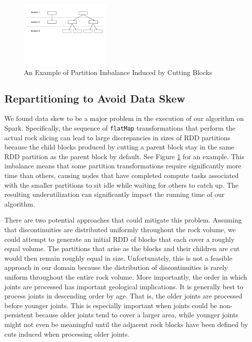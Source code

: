 \begin{figure}[h]
\centering
\includegraphics[width=0.4\textwidth]{flatMap.pdf}
\caption{An Example of Partition Imbalance Induced by Cutting Blocks}
\label{fig:flatMap}
\end{figure}

\subsection{Repartitioning to Avoid Data Skew}
We found data skew to be a major problem in the execution of our algorithm on Spark. Specifically, the sequence of \texttt{flatMap} transformations that perform the actual rock slicing can lead to large discrepancies in sizes of RDD partitions because the child blocks produced by cutting a parent block stay in the same RDD partition as the parent block by default. See Figure \ref{fig:flatMap} for an example. This imbalance means that some partition transformations require significantly more time than others, causing nodes that have completed compute tasks associated with the smaller partitions to sit idle while waiting for others to catch up. The resulting underutilization can significantly impact the running time of our algorithm.

There are two potential approaches that could mitigate this problem. Assuming that discontinuities are distributed uniformly throughout the rock volume, we could attempt to generate an initial RDD of blocks that each cover a roughly equal volume. The partitions that arise as the blocks and their children are cut would then remain roughly equal in size. Unfortunately, this is not a feasible approach in our domain because the distribution of discontinuities is rarely uniform throughout the entire rock volume. More importantly, the order in which joints are processed has important geological implications. It is generally best to process joints in descending order by age. That is, the older joints are processed before younger joints. This is especially important when joints could be non-persistent because older joints tend to cover a larger area, while younger joints might not even be meaningful until the adjacent rock blocks have been defined by cuts induced when processing older joints.

